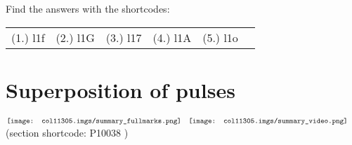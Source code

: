   \label{m38801**end}
\par {} Find the answers with the shortcodes:
 \par \begin{tabular}[h]{cccccc}
 (1.) l1f  &  (2.) l1G  &  (3.) l17  &  (4.) l1A  &  (5.) l1o  & \end{tabular}
         \section{ Superposition of pulses}
    \nopagebreak
            \label{m38802} $ \hspace{-5pt}\begin{array}{cccccccccccc}   \texttt{[image: col11305.imgs/summary\_fullmarks.png]} &   \texttt{[image: col11305.imgs/summary\_video.png]} &   \end{array} $ \hspace{2 pt}\raisebox{-5 pt}{} {(section shortcode: P10038 )} \par 
\label{m38802*fs-id1166232432154}
